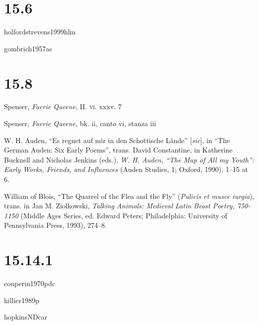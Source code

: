 \documentclass[extrafontsizes,11pt,a4paper,oneside]{memoir}
\begin{document}
    \section*{15.6} %
    
    {holfordstrevens1999hlm}
    
    {gombrich1957as}
    
    \section*{15.8} %
    
    Spenser, \emph{Faerie Queene}, II. \textsc{vi}. xxxv. 7
    
    Spenser, \emph{Faerie Queene}, bk. ii, canto vi, stanza iii
    
    W. H. Auden, \enquote{Es regnet auf mir in den Schottische Lände} [\emph{sic}], in \enquote{The German Auden: Six Early Poems}, trans. David Constantine, in Katherine Bucknell and Nicholas Jenkins (eds.), \emph{W. H. Auden, \enquote{The Map of All my Youth}: Early Works, Friends, and Influences} (Auden Studies, 1; Oxford, 1990), 1--15 at 6.
    
    William of Blois, \enquote{The Quarrel of the Flea and the Fly} (\emph{Pulicis et musce iurgia}), trans. in Jan M. Ziolkowski, \emph{Talking Animals: Medieval Latin Beast Poetry, 750-1150} (Middle Ages Series, ed. Edward Peters; Philadelphia: University of Pennsylvania Press, 1993), 274--8.
    
    \section*{15.14.1} %
    
    {couperin1970pdc}
    
    {hillier1989p}
    
    {hopkinsNDcar}
    
\end{document}
